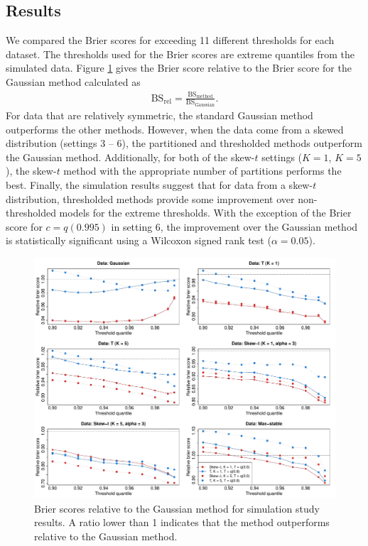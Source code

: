 \documentclass[11pt]{article}
\begin{document}
\subsection{Results}\label{s:simresults}
We compared the Brier scores for exceeding 11 different thresholds for each dataset.
The thresholds used for the Brier scores are extreme quantiles from the simulated data.
Figure \ref{fig:simbrierscores} gives the Brier score relative to the Brier score for the Gaussian method calculated as
\begin{align*}
  \text{BS}_{\text{rel}} = \frac{\text{BS}_{\text{method}}}{\text{BS}_{\text{Gaussian}}}.
\end{align*}
For data that are relatively symmetric, the standard Gaussian method outperforms the other methods.
However, when the data come from a skewed distribution (settings 3 -- 6), the partitioned and thresholded methods outperform the Gaussian method.
Additionally, for both of the skew-$t$ settings ($K = 1$, $K = 5$), the skew-$t$ method with the appropriate number of partitions performs the best.
Finally, the simulation results suggest that for data from a skew-$t$ distribution, thresholded methods provide some improvement over non-thresholded models for the extreme thresholds.
With the exception of the Brier score for $c = q(0.995)$ in setting 6, the improvement over the Gaussian method is statistically significant using a Wilcoxon signed rank test ($\alpha = 0.05$).


\begin{figure}
  \includegraphics[width=\linewidth]{plots/bsplots-mean.pdf}
  \caption{Brier scores relative to the Gaussian method for simulation study results. A ratio lower than 1 indicates that the method outperforms relative to the Gaussian method.}
  \label{fig:simbrierscores}
\end{figure}
\end{document}

